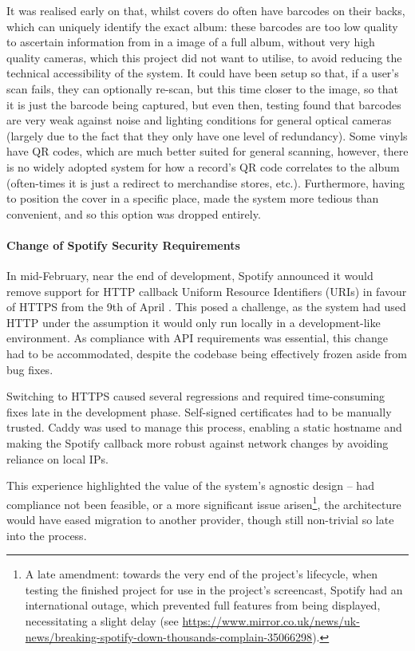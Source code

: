                 It was realised early on that, whilst covers do often have barcodes on their backs, which can uniquely identify the exact album: these barcodes are too low quality to ascertain information from in a image of a full album, without very high quality cameras, which this project did not want to utilise, to avoid reducing the technical accessibility of the system. It could have been setup so that, if a user's scan fails, they can optionally re-scan, but this time closer to the image, so that it is just the barcode being captured, but even then, testing found that barcodes are very weak against noise and lighting conditions for general optical cameras (largely due to the fact that they only have one level of redundancy). Some vinyls have QR codes, which are much better suited for general scanning, however, there is no widely adopted system for how a record's QR code correlates to the album (often-times it is just a redirect to merchandise stores, etc.). Furthermore, having to position the cover in a specific place, made the system more tedious than convenient, and so this option was dropped entirely.
    
                \paragraph{Change of Spotify Security Requirements}
    
                In mid-February, near the end of development, Spotify announced it would remove support for HTTP callback Uniform Resource Identifiers (URIs) in favour of HTTPS from the 9th of April \cite{spotify2025security}. This posed a challenge, as the system had used HTTP under the assumption it would only run locally in a development-like environment. As compliance with API requirements was essential, this change had to be accommodated, despite the codebase being effectively frozen aside from bug fixes.
    
                Switching to HTTPS caused several regressions and required time-consuming fixes late in the development phase. Self-signed certificates had to be manually trusted. Caddy was used to manage this process, enabling a static hostname and making the Spotify callback more robust against network changes by avoiding reliance on local IPs.
    
                This experience highlighted the value of the system's agnostic design -- had compliance not been feasible, or a more significant issue arisen\footnote{A late amendment: towards the very end of the project's lifecycle, when testing the finished project for use in the project's screencast, Spotify had an international outage, which prevented full features from being displayed, necessitating a slight delay (see \url{https://www.mirror.co.uk/news/uk-news/breaking-spotify-down-thousands-complain-35066298}).}, the architecture would have eased migration to another provider, though still non-trivial so late into the process.
    
